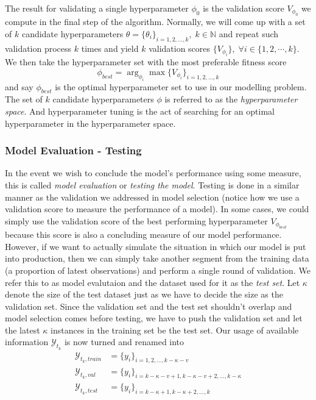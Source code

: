 The result for validating a single hyperparameter $\phi_0$ is the validation score $V_{\phi_0}$ we compute in the final step of the algorithm. Normally, we will come up with a set of $k$ candidate hyperparameters $\theta = \{ \theta_i \}_{i = 1, 2, \ldots, k}, \; k \in \mathbb{N}$ and repeat such validation process $k$ times and yield $k$ validation scores $\{ V_{\phi_i} \}, \; \forall i \in \{1, 2, \cdots, k \}$. We then take the hyperparameter set with the most preferable fitness score
\begin{equation*} 
    \phi_{best} = \arg_{\phi_i} \max \{ V_{\phi_i} \}_{i = 1, 2, \ldots, k}
\end{equation*}
and say $\phi_{best}$ is the optimal hyperparameter set to use in our modelling problem. The set of $k$ candidate hyperparameters $\phi$ is referred to as the \textit{hyperparameter space}. And hyperparameter tuning is the act of searching for an optimal hyperparameter in the hyperparameter space.

\subsubsection{Model Evaluation - Testing}
In the event we wish to conclude the model's performance using some measure, this is called \textit{model evaluation} or \textit{testing the model}. Testing is done in a similar manner as the validation we addressed in model selection (notice how we use a validation score to measure the performance of a model). In some cases, we could simply use the validation score of the best performing hyperparameter $V_{\phi_{best}}$ because this score is also a concluding measure of our model performance. However, if we want to actually simulate the situation in which our model is put into production, then we can simply take another segment from the training data (a proportion of latest observations) and perform a single round of validation. We refer this to as model evalutaion and the dataset used for it as the \textit{test set}. Let $\kappa$ denote the size of the test dataset just as we have to decide the size as the validation set. Since the validation set and the test set shouldn't overlap and model selection comes before testing, we have to push the validation set and let the latest $\kappa$ instances in the training set be the test set. Our usage of available information $\mathcal{Y}_{t_k}$ is now turned and renamed into
\begin{align*}
    \mathcal{Y}_{t_k, train} &= \{y_i \}_{i = 1, 2, \ldots, k - \kappa - v}                 \\
    \mathcal{Y}_{t_k, val} &= \{y_i \}_{i = k-\kappa-v+1,k-\kappa-v+2, \ldots, k-\kappa}  \\
    \mathcal{Y}_{t_k, test} &= \{y_i \}_{i = k-\kappa+1,k-\kappa+2, \ldots, k}
\end{align*}

